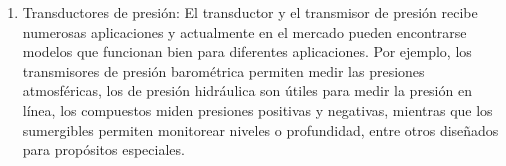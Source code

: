\begin{enumerate}
\begin{enumerate}
			\item Transductores de presión: El transductor y el transmisor de presión recibe numerosas aplicaciones y actualmente en el mercado pueden encontrarse modelos que funcionan bien para diferentes aplicaciones. Por ejemplo, los transmisores de presión barométrica permiten medir las presiones atmosféricas, los de presión hidráulica son útiles para medir la presión en línea, los compuestos miden presiones positivas y negativas, mientras que los sumergibles permiten monitorear niveles o profundidad, entre otros diseñados para propósitos especiales. \cite{TransductorPresión} \\
			
			\begin{figure}[h]
				\centering
				\hfill
			\end{figure}
			

\end{enumerate}
\end{enumerate}
